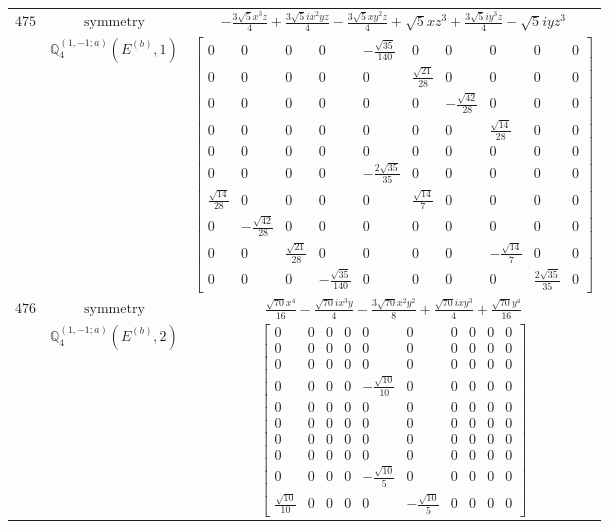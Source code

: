 \documentclass[fleqn,8pt,landscape]{jsarticle}
\begin{document}
\begin{longtable}{ccc}
$ 475 $ & $ \text{symmetry} $ & $ - \frac{3 \sqrt{5} x^{3} z}{4} + \frac{3 \sqrt{5} i x^{2} y z}{4} - \frac{3 \sqrt{5} x y^{2} z}{4} + \sqrt{5} x z^{3} + \frac{3 \sqrt{5} i y^{3} z}{4} - \sqrt{5} i y z^{3} $ \\
$  $ & $ \mathbb{Q}_{4}^{(1,-1;a)}(E^{(b)},1) $ & $ \begin{bmatrix} 0 & 0 & 0 & 0 & - \frac{\sqrt{35}}{140} & 0 & 0 & 0 & 0 & 0 \\ 0 & 0 & 0 & 0 & 0 & \frac{\sqrt{21}}{28} & 0 & 0 & 0 & 0 \\ 0 & 0 & 0 & 0 & 0 & 0 & - \frac{\sqrt{42}}{28} & 0 & 0 & 0 \\ 0 & 0 & 0 & 0 & 0 & 0 & 0 & \frac{\sqrt{14}}{28} & 0 & 0 \\ 0 & 0 & 0 & 0 & 0 & 0 & 0 & 0 & 0 & 0 \\ 0 & 0 & 0 & 0 & - \frac{2 \sqrt{35}}{35} & 0 & 0 & 0 & 0 & 0 \\ \frac{\sqrt{14}}{28} & 0 & 0 & 0 & 0 & \frac{\sqrt{14}}{7} & 0 & 0 & 0 & 0 \\ 0 & - \frac{\sqrt{42}}{28} & 0 & 0 & 0 & 0 & 0 & 0 & 0 & 0 \\ 0 & 0 & \frac{\sqrt{21}}{28} & 0 & 0 & 0 & 0 & - \frac{\sqrt{14}}{7} & 0 & 0 \\ 0 & 0 & 0 & - \frac{\sqrt{35}}{140} & 0 & 0 & 0 & 0 & \frac{2 \sqrt{35}}{35} & 0 \end{bmatrix} $ \\ \hline
$ 476 $ & $ \text{symmetry} $ & $ \frac{\sqrt{70} x^{4}}{16} - \frac{\sqrt{70} i x^{3} y}{4} - \frac{3 \sqrt{70} x^{2} y^{2}}{8} + \frac{\sqrt{70} i x y^{3}}{4} + \frac{\sqrt{70} y^{4}}{16} $ \\
$  $ & $ \mathbb{Q}_{4}^{(1,-1;a)}(E^{(b)},2) $ & $ \begin{bmatrix} 0 & 0 & 0 & 0 & 0 & 0 & 0 & 0 & 0 & 0 \\ 0 & 0 & 0 & 0 & 0 & 0 & 0 & 0 & 0 & 0 \\ 0 & 0 & 0 & 0 & 0 & 0 & 0 & 0 & 0 & 0 \\ 0 & 0 & 0 & 0 & - \frac{\sqrt{10}}{10} & 0 & 0 & 0 & 0 & 0 \\ 0 & 0 & 0 & 0 & 0 & 0 & 0 & 0 & 0 & 0 \\ 0 & 0 & 0 & 0 & 0 & 0 & 0 & 0 & 0 & 0 \\ 0 & 0 & 0 & 0 & 0 & 0 & 0 & 0 & 0 & 0 \\ 0 & 0 & 0 & 0 & 0 & 0 & 0 & 0 & 0 & 0 \\ 0 & 0 & 0 & 0 & - \frac{\sqrt{10}}{5} & 0 & 0 & 0 & 0 & 0 \\ \frac{\sqrt{10}}{10} & 0 & 0 & 0 & 0 & - \frac{\sqrt{10}}{5} & 0 & 0 & 0 & 0 \end{bmatrix} $ \\ \hline

\end{longtable}
\end{document}
